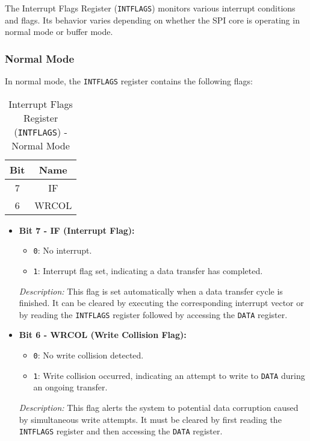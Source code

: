   The Interrupt Flags Register (\texttt{INTFLAGS}) monitors various interrupt conditions and flags. Its behavior varies depending on whether the SPI core is operating in normal mode or buffer mode.
  
  \subsubsection{Normal Mode}
  In normal mode, the \texttt{INTFLAGS} register contains the following flags:
  
  \begin{table}[H]
      \centering
      \caption{Interrupt Flags Register (\texttt{INTFLAGS}) - Normal Mode}
      \begin{tabular}{@{}cc@{}}
          \toprule
          \textbf{Bit} & \textbf{Name} \\ \midrule
          7 & IF \\
          6 & WRCOL \\ \bottomrule
      \end{tabular}
      \label{tab:intflags_normal}
  \end{table}
  
  \begin{itemize}
      \item \textbf{Bit 7 - IF (Interrupt Flag):} 
      \begin{itemize}
          \item \texttt{0}: No interrupt.
          \item \texttt{1}: Interrupt flag set, indicating a data transfer has completed.
      \end{itemize}
      \textit{Description:} This flag is set automatically when a data transfer cycle is finished. It can be cleared by executing the corresponding interrupt vector or by reading the \texttt{INTFLAGS} register followed by accessing the \texttt{DATA} register.
      
      \item \textbf{Bit 6 - WRCOL (Write Collision Flag):} 
      \begin{itemize}
          \item \texttt{0}: No write collision detected.
          \item \texttt{1}: Write collision occurred, indicating an attempt to write to \texttt{DATA} during an ongoing transfer.
      \end{itemize}
      \textit{Description:} This flag alerts the system to potential data corruption caused by simultaneous write attempts. It must be cleared by first reading the \texttt{INTFLAGS} register and then accessing the \texttt{DATA} register.
  \end{itemize}
  
